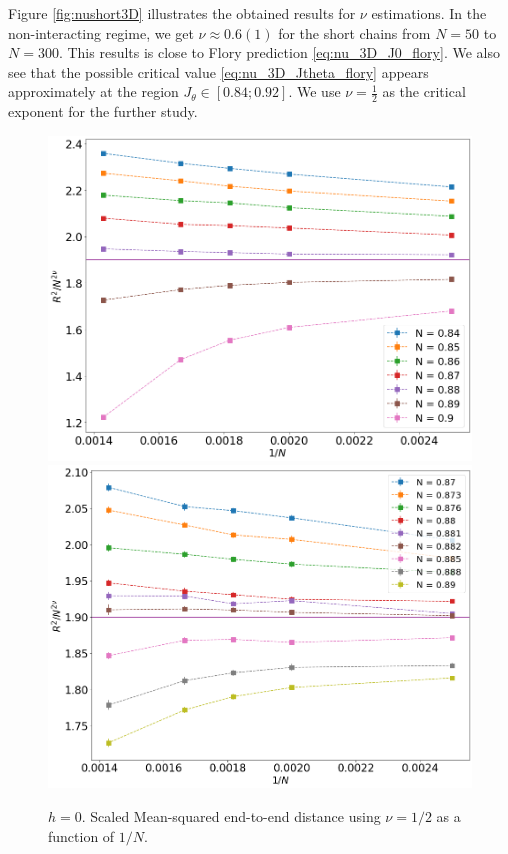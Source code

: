 Figure \ref{fig:nushort3D} illustrates the obtained results for $\nu$ estimations. In the non-interacting regime, we get $\nu \approx 0.6(1) $ for the short chains from $N=50$ to $N=300$. This results is close to Flory prediction \eqref{eq:nu_3D_J0_flory}. We also see that the possible critical value \eqref{eq:nu_3D_Jtheta_flory} appears approximately at the region $J_{\theta} \in [0.84; 0.92]$. We use $\nu = \frac{1}{2}$ as the critical exponent for the further study. 

 \begin{figure}[H]
	\centering
	\includegraphics[scale=0.22]{Images/rscaling_longchainscross_3D.png} 
	\includegraphics[scale=0.22]{Images/rscaling_longchainscross_3D_deep.png} 
	\caption{$h=0$. Scaled Mean-squared end-to-end distance using $\nu=1/2$ as a function of $1/N$.   }
	\label{fig:Rscaled3D}
\end{figure}

